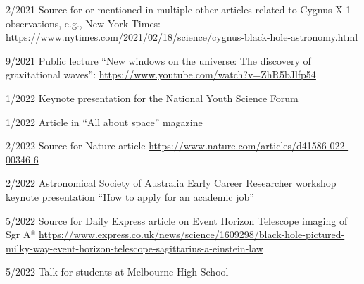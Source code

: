 \documentclass[margin,line]{res}
\begin{document}
\begin{resume}
2/2021	Source for or mentioned in multiple other articles related to Cygnus X-1 observations, e.g., New York Times: \url{https://www.nytimes.com/2021/02/18/science/cygnus-black-hole-astronomy.html}
	  
9/2021	Public lecture ``New windows on the universe: The discovery of gravitational waves'': \url{https://www.youtube.com/watch?v=ZhR5bJlfp54}

1/2022	Keynote presentation for the National Youth Science Forum

1/2022	Article in ``All about space'' magazine
	  
2/2022  	Source for Nature article \url{https://www.nature.com/articles/d41586-022-00346-6}

2/2022	Astronomical Society of Australia Early Career Researcher workshop keynote presentation ``How to apply for an academic job'' 

5/2022	Source for Daily Express article on Event Horizon Telescope imaging of Sgr A* \url{https://www.express.co.uk/news/science/1609298/black-hole-pictured-milky-way-event-horizon-telescope-sagittarius-a-einstein-law}

5/2022	Talk for students at Melbourne High School
	  
\end{resume}
\end{document}
